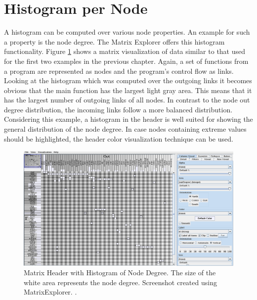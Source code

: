 \section{Histogram per Node}
\label{sec:histogram-per-node}
A histogram can be computed over various node properties. An example for such a property is the node degree. The Matrix Explorer offers this histogram functionality. Figure \ref{fig:header_matrixexplorer_histogram} shows a matrix visualization of data similar to that used for the first two examples in the previous chapter. Again, a set of functions from a program are represented as nodes and the program’s control flow as links. Looking at the histogram which was computed over the outgoing links it becomes obvious that the main function has the largest light gray area. This means that it has the largest number of outgoing links of all nodes. In contrast to the node out degree distribution, the incoming links follow a more balanced distribution. Considering this example, a histogram in the header is well suited for showing the general distribution of the node degree. In case nodes containing extreme values should be highlighted, the header color visualization technique can be used.
\begin{figure}[H]
  \includegraphics[width=\textwidth]{images/Header_MatrixExplorer_histogram.png}
  \caption{Matrix Header with Histogram of Node Degree. The size of the white area represents the node degree. Screenshot created using MatrixExplorer. \citep{henry-phd-2008}. \label{fig:header_matrixexplorer_histogram}}
\end{figure}

